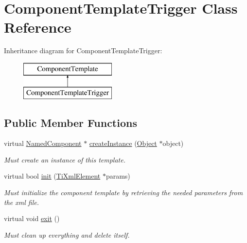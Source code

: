 \hypertarget{classComponentTemplateTrigger}{
\section{\-Component\-Template\-Trigger \-Class \-Reference}
\label{d7/d4e/classComponentTemplateTrigger}
}
\-Inheritance diagram for \-Component\-Template\-Trigger\-:\begin{figure}[H]
\begin{center}
\leavevmode
\includegraphics[height=2.000000cm]{d7/d4e/classComponentTemplateTrigger}
\end{center}
\end{figure}
\subsection*{\-Public \-Member \-Functions}
\begin{DoxyCompactItemize}
\item 
\hypertarget{classComponentTemplateTrigger_a05284cbc166a34cccd7e121d62baf222}{
virtual \hyperlink{classNamedComponent}{\-Named\-Component} $\ast$ \hyperlink{classComponentTemplateTrigger_a05284cbc166a34cccd7e121d62baf222}{create\-Instance} (\hyperlink{classObject}{\-Object} $\ast$object)}
\label{d7/d4e/classComponentTemplateTrigger_a05284cbc166a34cccd7e121d62baf222}

\begin{DoxyCompactList}\small\item\em \-Must create an instance of this template. \end{DoxyCompactList}\item 
\hypertarget{classComponentTemplateTrigger_afb4f56aaea6f4251dca08beafdcd571a}{
virtual bool \hyperlink{classComponentTemplateTrigger_afb4f56aaea6f4251dca08beafdcd571a}{init} (\hyperlink{classTiXmlElement}{\-Ti\-Xml\-Element} $\ast$params)}
\label{d7/d4e/classComponentTemplateTrigger_afb4f56aaea6f4251dca08beafdcd571a}

\begin{DoxyCompactList}\small\item\em \-Must initialize the component template by retrieving the needed parameters from the xml file. \end{DoxyCompactList}\item 
\hypertarget{classComponentTemplateTrigger_ae13c9b650092466fa210bd68a4504307}{
virtual void \hyperlink{classComponentTemplateTrigger_ae13c9b650092466fa210bd68a4504307}{exit} ()}
\label{d7/d4e/classComponentTemplateTrigger_ae13c9b650092466fa210bd68a4504307}

\begin{DoxyCompactList}\small\item\em \-Must clean up everything and delete itself. \end{DoxyCompactList}\end{DoxyCompactItemize}
